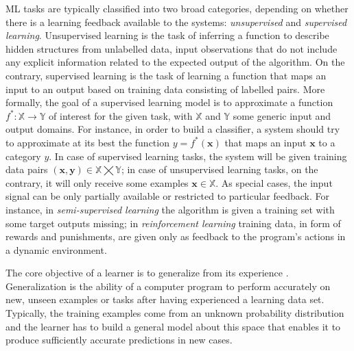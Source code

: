 ML tasks are typically classified into two broad categories, depending on whether there is a learning feedback available to the systems: \textit{unsupervised} and \textit{supervised learning}. Unsupervised learning is the task of inferring a function to describe hidden structures from unlabelled data, input observations that do not include any explicit information related to the expected output of the algorithm. On the contrary, supervised learning is the task of learning a function that maps an input to an output based on training data consisting of labelled pairs. More formally, the goal of a supervised learning model is to approximate a function $f^* : \mathbb{X} \to \mathbb{Y}$ of interest for the given task, with $\mathbb{X}$ and $\mathbb{Y}$ some generic input and output domains. For instance, in order to build a classifier, a system should try to approximate at its best the function $y=f^*(\bm{x})$ that maps an input $\bm{x}$ to a category $y$. In case of supervised learning tasks, the system will be given training data pairs $(\bm{x}, \bm{y}) \in \mathbb{X} \bigtimes \mathbb{Y}$; in case of unsupervised learning tasks, on the contrary, it will only receive some examples $\bm{x} \in \mathbb{X}$. As special cases, the input signal can be only partially available or restricted to particular feedback. For instance, in \textit{semi-supervised learning} the algorithm is given a training set with some target outputs missing; in \textit{reinforcement learning} training data, in form of rewards and punishments, are given only as feedback to the program's actions in a dynamic environment.

The core objective of a learner is to generalize from its experience \cite{bishop}. Generalization is the ability of a computer program to perform accurately on new, unseen examples or tasks after having experienced a learning data set. Typically, the training examples come from an unknown probability distribution and the learner has to build a general model about this space that enables it to produce sufficiently accurate predictions in new cases.

